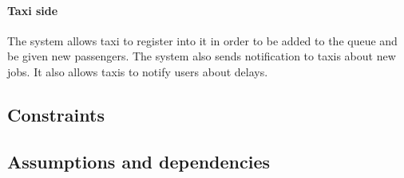 		\paragraph{Taxi side}The system allows taxi to register into it in order to be added to the queue and be given new passengers. The system also sends notification to taxis about new jobs. It also allows taxis to notify users about delays.
	\subsection{Constraints}
	\subsection{Assumptions and dependencies}